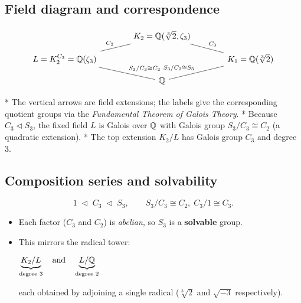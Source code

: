 \documentclass[12pt]{article}
\theoremstyle{definition} %
\theoremstyle{plain} %
\begin{document}
\subsection*{Field diagram and correspondence}

\[
\begin{tikzcd}[row sep=small,column sep=large]
           & K_2=\Bbb Q(\sqrt[3]{2},\zeta_3) \arrow[-]{dl}[swap]{C_2}
                                             \arrow[-]{dr}{C_3}
           & \\
  L=K_2^{C_3}=\Bbb Q(\zeta_3)
           &                                     &
  K_1=\Bbb Q(\sqrt[3]{2}) 
           \\
           & \Bbb Q \arrow[-]{ul}[swap]{S_3/C_3\cong C_2}
                      \arrow[-]{ur}{S_3/C_2\cong S_3}
           &
\end{tikzcd}
\]

*   The vertical arrows are field extensions;  
    the labels give the corresponding quotient groups via the
    \emph{Fundamental Theorem of Galois Theory}.  
*   Because $C_3\lhd S_3$, the fixed field $L$ is Galois over $\Bbb Q$
    with Galois group $S_3/C_3\cong C_2$ (a quadratic extension).
*   The top extension $K_2/L$ has Galois group $C_3$ and degree $3$.

\subsection*{Composition series and solvability}

\[
   1 \;\lhd\; C_3 \;\lhd\; S_3,
   \qquad
   S_3/C_3 \cong C_2,\;
   C_3/1 \cong C_3.
\]

\begin{itemize}
   \item Each factor (\(C_3\) and \(C_2\)) is \emph{abelian}, so
         \(S_3\) is a \textbf{solvable} group.
   \item This mirrors the radical tower:
         \begin{center}
            \(\displaystyle
              \underbrace{K_2/L}_{\text{degree $3$}}
              \quad\text{and}\quad
              \underbrace{L/\Bbb Q}_{\text{degree $2$}}
            \)
         \end{center}
         each obtained by adjoining a single radical 
         ($\sqrt[3]{2}$ and $\sqrt{-3}$ respectively).
\end{itemize}
\end{document}
